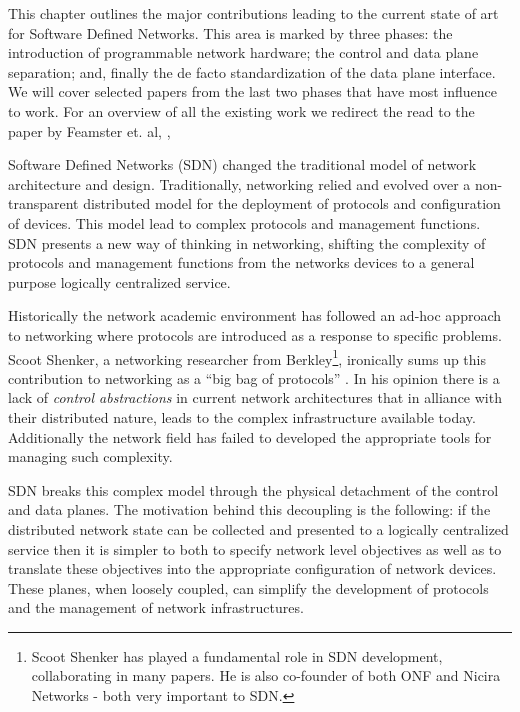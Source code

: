 


This chapter outlines the major contributions leading to the current state of art for Software Defined Networks. 
This area is marked by three phases: the introduction of programmable network hardware; the control and data plane separation; and, finally the de facto standardization of the data plane interface. 
We will cover selected papers from the last two phases that have most influence to work. 
For an overview of all the existing work we redirect the read to the paper by Feamster et. al, \cite{},  



Software Defined Networks (SDN) changed the traditional model of network architecture and design. 
Traditionally, networking  relied and evolved over a non-transparent distributed model for
the deployment  of  protocols and configuration of devices. 
This model lead to complex protocols and management functions. 
SDN presents a new way of thinking in networking, shifting the complexity of protocols and management functions from  the  networks devices to a general purpose logically centralized service. 

Historically  the network academic environment has followed an  ad-hoc approach to networking where protocols are introduced as a response to specific problems. 
Scoot Shenker, a networking researcher from Berkley\footnote{Scoot Shenker has played a fundamental role in SDN development, collaborating in many papers. He is also co-founder of both ONF \cite{onf} and Nicira Networks - both very important to SDN.}, ironically sums up  this contribution to networking as a ``big bag of protocols'' \cite{Shenker:2011ys}. 
In his opinion there is a lack of \emph{control abstractions} in current network architectures that in alliance  with  their  distributed nature, leads to the  complex infrastructure available today. 
Additionally the network field has failed to developed the appropriate tools for managing such complexity. 

SDN breaks this complex model through the physical detachment of the control and data planes.  
The motivation behind this decoupling is the following: if the distributed network state can be collected and presented to a logically centralized service then it is simpler to both to specify network level objectives as well as to translate these objectives into the appropriate configuration of network devices. 
These planes, when loosely coupled, can simplify the development of protocols and the management of network infrastructures. 



